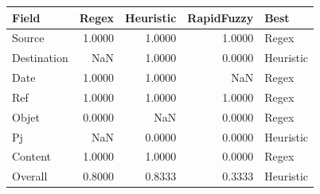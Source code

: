 \begin{tabular}{lrrrl}
\toprule
Field & Regex & Heuristic & RapidFuzzy & Best \\
\midrule
Source & 1.0000 & 1.0000 & 1.0000 & Regex \\
Destination & NaN & 1.0000 & 0.0000 & Heuristic \\
Date & 1.0000 & 1.0000 & NaN & Regex \\
Ref & 1.0000 & 1.0000 & 1.0000 & Regex \\
Objet & 0.0000 & NaN & 0.0000 & Regex \\
Pj & NaN & 0.0000 & 0.0000 & Heuristic \\
Content & 1.0000 & 1.0000 & 0.0000 & Regex \\
Overall & 0.8000 & 0.8333 & 0.3333 & Heuristic \\
\bottomrule
\end{tabular}

